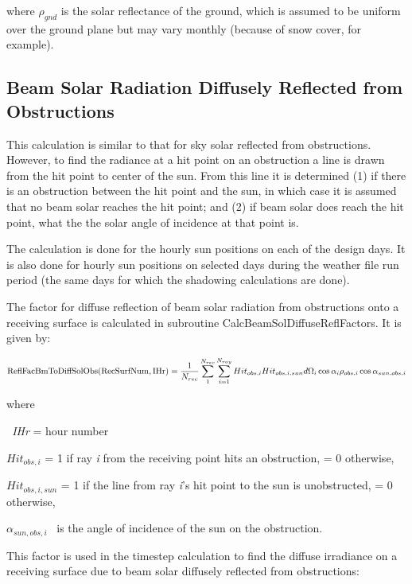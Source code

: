 where \({\rho_{gnd}}\) is the solar reflectance of the ground, which is assumed to be uniform over the ground plane but may vary monthly (because of snow cover, for example).

\subsection{Beam Solar Radiation Diffusely Reflected from Obstructions}\label{beam-solar-radiation-diffusely-reflected-from-obstructions}

This calculation is similar to that for sky solar reflected from obstructions. However, to find the radiance at a hit point on an obstruction a line is drawn from the hit point to center of the sun. From this line it is determined (1) if there is an obstruction between the hit point and the sun, in which case it is assumed that no beam solar reaches the hit point; and (2) if beam solar does reach the hit point, what the the solar angle of incidence at that point is.

The calculation is done for the hourly sun positions on each of the design days. It is also done for hourly sun positions on selected days during the weather file run period (the same days for which the shadowing calculations are done).

The factor for diffuse reflection of beam solar radiation from obstructions onto a receiving surface is calculated in subroutine CalcBeamSolDiffuseReflFactors. It is given by:

\begin{equation}
{\rm{ReflFacBmToDiffSolObs(RecSurfNum,IHr)}} = \frac{1}{{{N_{rec}}}}\sum\limits_1^{{N_{rec}}} {\sum\limits_{i = 1}^{{N_{ray}}} {Hi{t_{obs,i}}Hi{t_{obs,i,sun}}d{\Omega_i}\cos {\alpha_i}{\rho_{obs,i}}\cos {\alpha_{sun,obs,i}}} }
\end{equation}

where

\emph{~IHr} = hour number

\(Hi{t_{obs,i}}\) = 1 if ray \emph{i} from the receiving point hits an obstruction, = 0 otherwise,

\(Hi{t_{obs,i,sun}}\) = 1 if the line from ray \emph{i}'s hit point to the sun is unobstructed, = 0 otherwise,

\({\alpha_{sun,obs,i}}\) ~is the angle of incidence of the sun on the obstruction.

This factor is used in the timestep calculation to find the diffuse irradiance on a receiving surface due to beam solar diffusely reflected from obstructions:

